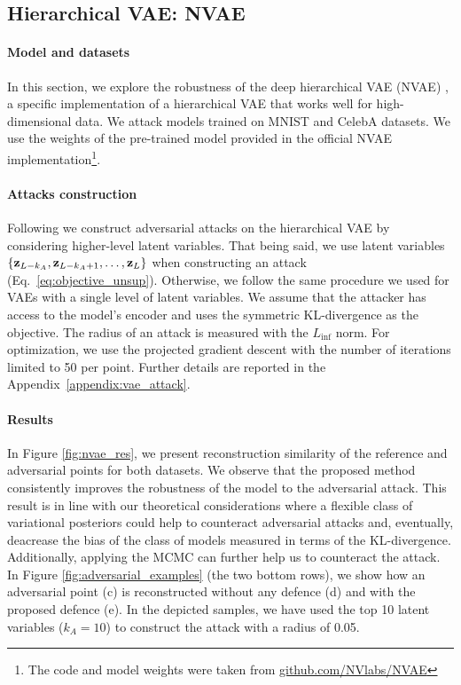 {\subsection{Hierarchical VAE: NVAE}\label{sec:nvae}

\paragraph{Model and datasets} In this section, we explore the robustness of the deep hierarchical VAE (NVAE) \cite{vahdat2020nvae}, a specific implementation of a hierarchical VAE that works well for high-dimensional data. We attack models trained on MNIST and CelebA \cite{liu2015faceattributes} datasets. We use the weights of the pre-trained model provided in the official NVAE implementation\footnote{The code and model weights were taken from \url{github.com/NVlabs/NVAE}}. 

\paragraph{Attacks construction}
Following \citet{kuzina2021adv} we construct adversarial attacks on the hierarchical VAE by considering higher-level latent variables. That being said, we use latent variables $\{{\mathbf{z}}_{L-k_A}, {\mathbf{z}}_{L-k_A+1}, \dots, {\mathbf{z}}_L\}$ when constructing an attack (Eq.~\ref{eq:objective_unsup}). Otherwise, we follow the same procedure we used for VAEs with a single level of latent variables. We assume that the attacker has access to the model's encoder and uses the symmetric KL-divergence as the objective. The radius of an attack is measured with the $L_{\inf}$ norm. For optimization, we use the projected gradient descent with the number of iterations limited to 50 per point. Further details are reported in the Appendix~\ref{appendix:vae_attack}.


\paragraph{Results}
In Figure \ref{fig:nvae_res}, we present reconstruction similarity of the reference and adversarial points for both datasets. We observe that the proposed method consistently improves the robustness of the model to the adversarial attack. This result is in line with our theoretical considerations where a flexible class of variational posteriors could help to counteract adversarial attacks and, eventually, deacrease the bias of the class of models measured in terms of the KL-divergence. Additionally, applying the MCMC can further help us to counteract the attack. In Figure \ref{fig:adversarial_examples} (the two bottom rows), we show how an adversarial point (c) is reconstructed without any defence (d) and with the proposed defence (e). In the depicted samples, we have used the top 10 latent variables ($k_A = 10$) to construct the attack with a radius of 0.05. 



}
